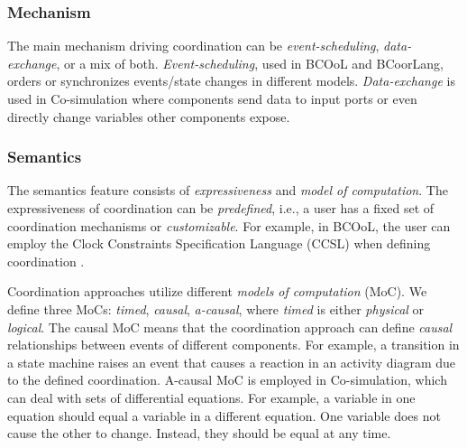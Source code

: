 \documentclass[runningheads]{llncs}
\begin{document}
\subsubsection{Mechanism} The main mechanism driving coordination can be \textit{event-scheduling}, \textit{data-exchange}, or a mix of both. %
\textit{Event-scheduling}, used in BCOoL and BCoorLang, orders or synchronizes events/state changes in different models.
\textit{Data-exchange} is used in Co-simulation where components send data to input ports or even directly change variables other components expose.

\subsubsection{Semantics} The semantics feature consists of \textit{expressiveness} and \textit{model of computation}.
The expressiveness of coordination can be \textit{predefined}, i.e., a user has a fixed set of coordination mechanisms or \textit{customizable}.
For example, in BCOoL, the user can employ the Clock Constraints Specification Language (CCSL) \cite{andreSyntaxSemanticsClock2009} when defining coordination \cite{varalarsenBCOolBehavioralCoordination2016,varalarsenBehavioralCoordinationOperator2015}.

Coordination approaches utilize different \textit{models of computation} (MoC).
We define three MoCs: \textit{timed}, \textit{causal}, \textit{a-causal}, where \textit{timed} is either \textit{physical} or \textit{logical}.
The causal MoC means that the coordination approach can define \textit{causal} relationships between events of different components.
For example, a transition in a state machine raises an event that causes a reaction in an activity diagram due to the defined coordination.
A-causal MoC is employed in Co-simulation, which can deal with sets of differential equations.
For example, a variable in one equation should equal a variable in a different equation.
One variable does not cause the other to change.
Instead, they should be equal at any time.
\end{document}
